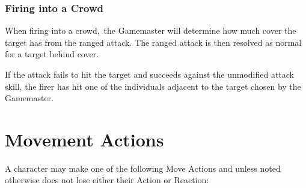 \begin{table}[H]
\begin{center}
\begin{rpg-table}[|p{5cm}|Y|]
	\hline
	\\
	\\
	\\
	\\
	\\
\end{rpg-table}
\end{center}
\end{table}




\subsubsection{Firing into a Crowd}
When firing into a crowd, the Gamemaster will determine how much cover the target has from the ranged attack. The ranged attack is then resolved as normal for a target behind cover. 

If the attack fails to hit the target and succeeds against the unmodified attack skill, the firer has hit one of the individuals adjacent to the target chosen by the Gamemaster. 


\section{Movement Actions}
A character may make one of the following Move Actions and unless noted otherwise does not lose either their Action or Reaction:

